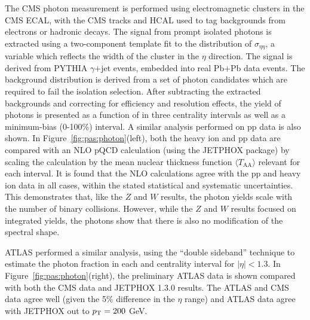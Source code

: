 The CMS photon measurement is performed using electromagnetic clusters in the CMS ECAL, with the
CMS tracks and HCAL used to tag backgrounds from electrons or hadronic decays.  
The signal from prompt isolated photons is extracted using a two-component template fit to
the distribution of $\sigma_{\eta\eta}$, a variable which reflects the width of the cluster
in the $\eta$ direction.  The signal is derived from PYTHIA $\gamma$+jet events, embedded 
into real Pb+Pb data events.  The background distribution is derived from a set of photon
candidates which are required to fail the isolation selection.
After subtracting the extracted backgrounds and correcting for efficiency and resolution
effects, the yield of photons is presented as a function of \pT in three centrality intervals
as well as a minimum-bias (0-100\%) interval.  A similar analysis performed on pp data is
also shown.
In Figure~\ref{fig:pas:photon}(left), 
both the heavy ion and pp data are compared with an NLO pQCD calculation (using the
JETPHOX package) by scaling the calculation by the mean nuclear
thickness function $\langle T_{\mathrm{AA}} \rangle$ relevant for each interval.
It is found that the NLO calculations agree with the pp and heavy ion data in all cases, within
the stated statistical and systematic uncertainties.  This demonstrates that, like the 
$Z$ and $W$ results, the photon yields scale with the number of binary collisions.
However, while the $Z$ and $W$ results focused on integrated yields, the photons show that
there is also no modification of the spectral shape.

ATLAS performed a similar analysis, using the ``double sideband'' technique to estimate the
photon fraction in each \pT and centrality interval for $|\eta|<1.3$.  
In Figure~\ref{fig:pas:photon}(right), the preliminary ATLAS data is shown compared with both 
the CMS data and JETPHOX 1.3.0 results.  The ATLAS and CMS data agree well (given the 5\%
difference in the $\eta$ range) and ATLAS data agree with JETPHOX out to $\mbox{$p_{\mathrm{T}}$} = 200$ GeV.
